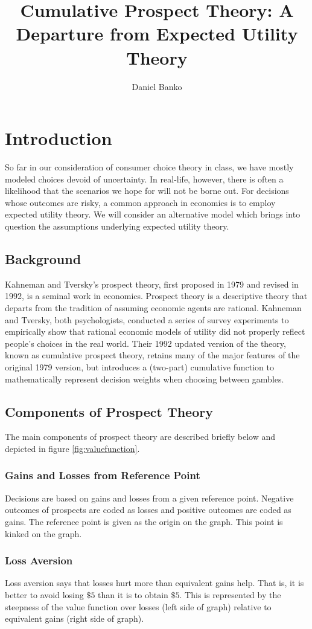 \documentclass[a4paper,12pt]{article}
\title{Cumulative Prospect Theory: A Departure from Expected Utility Theory}
\author{Daniel Banko}
\numberwithin{equation}{section}
\theoremstyle{definition}
\begin{document}
\maketitle

\section{Introduction}
So far in our consideration of consumer choice theory in class, we have mostly modeled choices devoid of uncertainty. In real-life, however, there is often a likelihood that the scenarios we hope for will not be borne out. For decisions whose outcomes are risky, a common approach in economics is to employ expected utility theory. We will consider an alternative model which brings into question the assumptions underlying expected utility theory.
\subsection{Background}
\indent Kahneman and Tversky's prospect theory, first proposed in 1979 and revised in 1992, is a seminal work in economics. Prospect theory is a descriptive theory that departs from the tradition of assuming economic agents are rational. Kahneman and Tversky, both psychologists, conducted a series of survey experiments to empirically show that rational economic models of utility did not properly reflect people's  choices in the real world. Their 1992 updated version of the theory, known as cumulative prospect theory, retains many of the major features of the original 1979 version, but introduces a (two-part) cumulative function to mathematically represent decision weights when choosing between gambles.

\subsection{Components of Prospect Theory}
The main components of prospect theory are described briefly below and depicted in figure \ref{fig:valuefunction}.
\subsubsection{Gains and Losses from Reference Point}
	Decisions are based on gains and losses from a given reference point. Negative outcomes of prospects are coded as losses and positive outcomes are coded as gains. The reference point is given as the origin on the graph. This point is kinked on the graph.
\subsubsection{Loss Aversion}
	Loss aversion says that losses hurt more than equivalent gains help. That is, it is better to avoid losing $\$5$ than it is to obtain $\$5$. This is represented by the steepness of the value function over losses (left side of graph) relative to equivalent gains (right side of graph).
\end{document}
